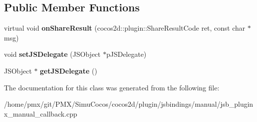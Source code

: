 \subsection*{Public Member Functions}
\begin{DoxyCompactItemize}
\item 
\mbox{\label{classPluginx__ShareResult_a2d55a80c9c64cc0f3b6ab01705d5f388}} 
virtual void {\bfseries on\+Share\+Result} (cocos2d\+::plugin\+::\+Share\+Result\+Code ret, const char $\ast$msg)
\item 
\mbox{\label{classPluginx__ShareResult_a8697d23d2a06e9797e4dc369fb98395a}} 
void {\bfseries set\+J\+S\+Delegate} (J\+S\+Object $\ast$p\+J\+S\+Delegate)
\item 
\mbox{\label{classPluginx__ShareResult_abbe56038117e20b5e693d7c21b8de738}} 
J\+S\+Object $\ast$ {\bfseries get\+J\+S\+Delegate} ()
\end{DoxyCompactItemize}


The documentation for this class was generated from the following file\+:\begin{DoxyCompactItemize}
\item 
/home/pmx/git/\+P\+M\+X/\+Simu\+Cocos/cocos2d/plugin/jsbindings/manual/jsb\+\_\+pluginx\+\_\+manual\+\_\+callback.\+cpp\end{DoxyCompactItemize}
